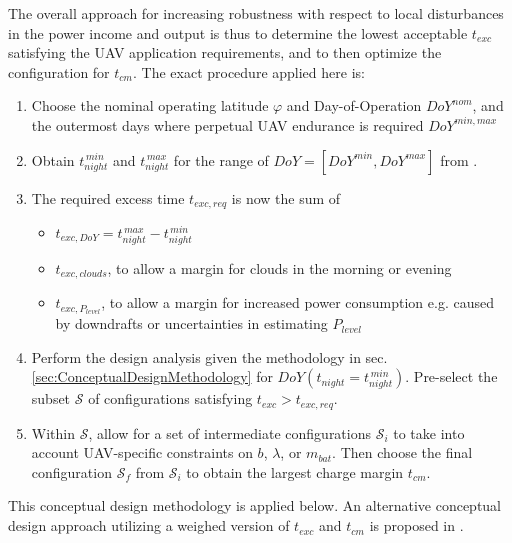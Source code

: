 The overall approach for increasing robustness with respect to local disturbances in the power income and output is thus to determine the lowest acceptable $t_{exc}$ satisfying the UAV application requirements, and to then optimize the configuration for $t_{cm}$. The exact procedure applied here is:
\begin{enumerate}
\item Choose the nominal operating latitude $\varphi$ and Day-of-Operation $DoY^{nom}$, and the outermost days where perpetual UAV endurance is required $DoY^{min,max}$
\item Obtain $t_{night}^{\,min}$ and $t_{night}^{\,max}$ for the range of $DoY=[DoY^{min},DoY^{max}]$ from \cite{Duffie_SolarEngineering}. 
\item The required excess time $t_{exc,req}$ is now the sum of 
\begin{itemize}
	\item $t_{exc,DoY} = t_{night}^{\,max}-t_{night}^{\,min}$
	\item $t_{exc,clouds}$, to allow a margin for clouds in the morning or evening
	\item $t_{exc,P_{level}}$, to allow a margin for increased power consumption e.g. caused by downdrafts or uncertainties in estimating $P_{level}$
\end{itemize}
\item Perform the design analysis given the methodology in sec. \ref{sec:ConceptualDesignMethodology} for $DoY(t_{night}=t_{night}^{\,min})$. Pre-select the subset $\mathcal{S}$ of configurations satisfying $t_{exc}>t_{exc,req}$.
\item Within $\mathcal{S}$, allow for a set of intermediate configurations $\mathcal{S}_i$ to take into account UAV-specific constraints on $b$, $\lambda$, or $m_{bat}$. Then choose the final configuration $\mathcal{S}_f$  from $\mathcal{S}_i$ to obtain the largest charge margin $t_{cm}$.
\end{enumerate}

This conceptual design methodology is applied below. An alternative conceptual design approach utilizing a weighed version of $t_{exc}$ and $t_{cm}$ is proposed in \cite{Morton_ICRA2013}. 

 
